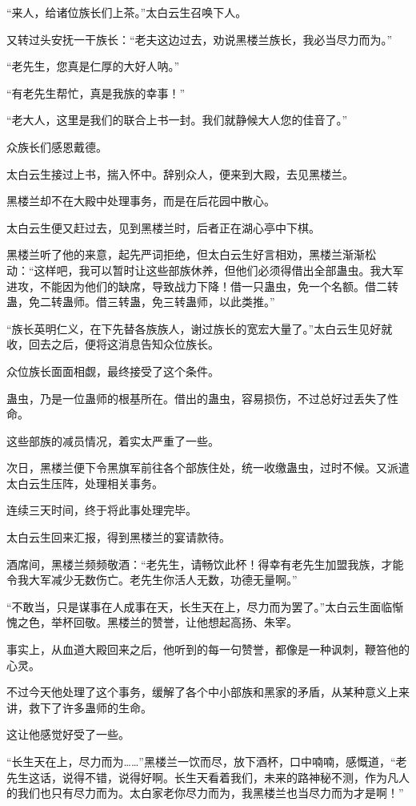 \begin{this_body}
“来人，给诸位族长们上茶。”太白云生召唤下人。

又转过头安抚一干族长：“老夫这边过去，劝说黑楼兰族长，我必当尽力而为。”

“老先生，您真是仁厚的大好人呐。”

“有老先生帮忙，真是我族的幸事！”

“老大人，这里是我们的联合上书一封。我们就静候大人您的佳音了。”

众族长们感恩戴德。

太白云生接过上书，揣入怀中。辞别众人，便来到大殿，去见黑楼兰。

黑楼兰却不在大殿中处理事务，而是在后花园中散心。

太白云生便又赶过去，见到黑楼兰时，后者正在湖心亭中下棋。

黑楼兰听了他的来意，起先严词拒绝，但太白云生好言相劝，黑楼兰渐渐松动：“这样吧，我可以暂时让这些部族休养，但他们必须得借出全部蛊虫。我大军进攻，不能因为他们的缺席，导致战力下降！借一只蛊虫，免一个名额。借二转蛊，免二转蛊师。借三转蛊，免三转蛊师，以此类推。”

“族长英明仁义，在下先替各族族人，谢过族长的宽宏大量了。”太白云生见好就收，回去之后，便将这消息告知众位族长。

众位族长面面相觑，最终接受了这个条件。

蛊虫，乃是一位蛊师的根基所在。借出的蛊虫，容易损伤，不过总好过丢失了性命。

这些部族的减员情况，着实太严重了一些。

次日，黑楼兰便下令黑旗军前往各个部族住处，统一收缴蛊虫，过时不候。又派遣太白云生压阵，处理相关事务。

连续三天时间，终于将此事处理完毕。

太白云生回来汇报，得到黑楼兰的宴请款待。

酒席间，黑楼兰频频敬酒：“老先生，请畅饮此杯！得幸有老先生加盟我族，才能令我大军减少无数伤亡。老先生你活人无数，功德无量啊。”

“不敢当，只是谋事在人成事在天，长生天在上，尽力而为罢了。”太白云生面临惭愧之色，举杯回敬。黑楼兰的赞誉，让他想起高扬、朱宰。

事实上，从血道大殿回来之后，他听到的每一句赞誉，都像是一种讽刺，鞭笞他的心灵。

不过今天他处理了这个事务，缓解了各个中小部族和黑家的矛盾，从某种意义上来讲，救下了许多蛊师的生命。

这让他感觉好受了一些。

“长生天在上，尽力而为……”黑楼兰一饮而尽，放下酒杯，口中喃喃，感慨道，“老先生这话，说得不错，说得好啊。长生天看着我们，未来的路神秘不测，作为凡人的我们也只有尽力而为。太白家老你尽力而为，我黑楼兰也当尽力而为才是啊！”


\end{this_body}
